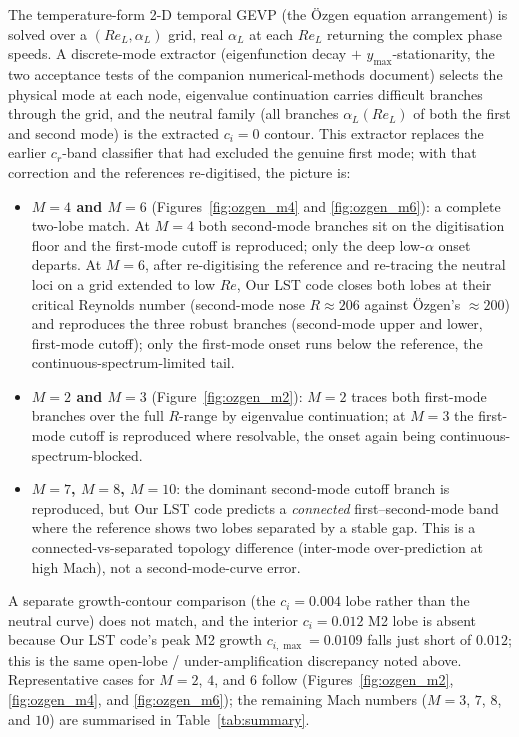 \documentclass[11pt]{article}
\begin{document}
The temperature-form 2-D temporal GEVP (the \"Ozgen equation arrangement) is solved over a
$(Re_L,\alpha_L)$ grid, real $\alpha_L$ at each $Re_L$ returning the complex phase speeds. A
discrete-mode extractor (eigenfunction decay $+$ $y_{\max}$-stationarity, the two acceptance tests
of the companion numerical-methods document) selects the physical mode at each node, eigenvalue
continuation carries difficult branches through the grid, and the neutral family (all branches
$\alpha_L(Re_L)$ of both the first and second mode) is the extracted $c_i=0$ contour. This extractor
replaces the earlier $c_r$-band classifier that had excluded the genuine first mode; with that
correction and the references re-digitised, the picture is:
\begin{itemize}[leftmargin=1.4em,itemsep=1pt]
\item \textbf{$M=4$ and $M=6$} (Figures~\ref{fig:ozgen_m4} and \ref{fig:ozgen_m6}): a complete
two-lobe match. At $M=4$ both second-mode branches sit on the digitisation floor and the first-mode
cutoff is reproduced; only the deep low-$\alpha$ onset departs. At $M=6$, after re-digitising the
reference and re-tracing the neutral loci on a grid extended to low $Re$, Our LST code closes both
lobes at their critical Reynolds number (second-mode nose $R\!\approx\!206$ against \"Ozgen's
$\approx\!200$) and reproduces the three robust branches (second-mode upper and lower, first-mode
cutoff); only the first-mode onset runs below the reference, the continuous-spectrum-limited tail.
\item \textbf{$M=2$ and $M=3$} (Figure~\ref{fig:ozgen_m2}): $M=2$ traces both first-mode branches
over the full $R$-range by eigenvalue continuation; at $M=3$ the first-mode cutoff is reproduced
where resolvable, the onset again being continuous-spectrum-blocked.
\item \textbf{$M=7$, $M=8$, $M=10$}: the dominant second-mode cutoff branch is reproduced, but
Our LST code predicts a \emph{connected} first--second-mode band where the reference shows two
lobes separated by a stable gap. This is a connected-vs-separated topology difference (inter-mode
over-prediction at high Mach), not a second-mode-curve error.
\end{itemize}
A separate growth-contour comparison (the $c_i=0.004$ lobe rather than the neutral curve) does not
match, and the interior $c_i=0.012$ M2 lobe is absent because Our LST code's peak M2 growth
$c_{i,\max}=0.0109$ falls just short of $0.012$; this is the same open-lobe / under-amplification
discrepancy noted above. Representative cases for $M=2$, $4$, and $6$ follow
(Figures~\ref{fig:ozgen_m2}, \ref{fig:ozgen_m4}, and \ref{fig:ozgen_m6}); the remaining Mach
numbers ($M=3$, $7$, $8$, and $10$) are summarised in Table~\ref{tab:summary}.
\end{document}
